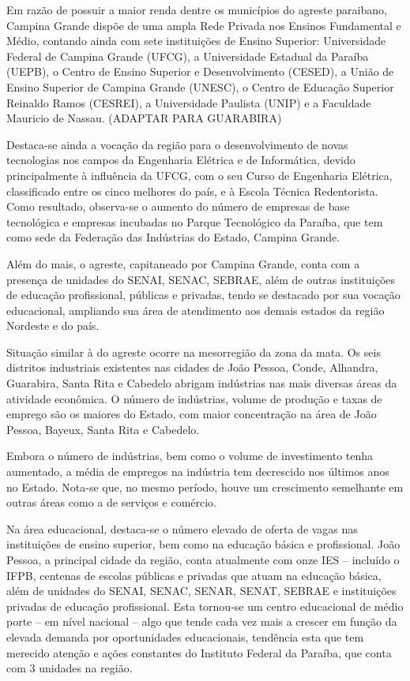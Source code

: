 	Em razão de possuir a maior renda dentre os municípios do agreste paraibano, Campina Grande dispõe de uma ampla Rede Privada nos Ensinos Fundamental e Médio, contando ainda com sete instituições de Ensino Superior: Universidade Federal de Campina Grande (UFCG), a Universidade Estadual da Paraíba (UEPB), o Centro de Ensino Superior e Desenvolvimento (CESED), a União de Ensino Superior de Campina Grande (UNESC), o Centro de Educação Superior Reinaldo Ramos (CESREI), a Universidade Paulista (UNIP) e a Faculdade Mauricio de Nassau. (ADAPTAR PARA GUARABIRA)


Destaca-se ainda a vocação da região para o desenvolvimento de novas tecnologias nos campos da Engenharia Elétrica e de Informática, devido principalmente à influência da UFCG, com o seu Curso de Engenharia Elétrica, classificado entre os cinco melhores do país, e à Escola Técnica Redentorista. Como resultado, observa-se o aumento do número de empresas de base tecnológica e empresas incubadas no Parque Tecnológico da Paraíba, que tem como sede da Federação das Indústrias do Estado, Campina Grande.

	Além do mais, o agreste, capitaneado por Campina Grande, conta com a presença de unidades do SENAI, SENAC, SEBRAE, além de outras instituições de educação profissional, públicas e privadas, tendo se destacado por sua vocação educacional, ampliando sua área de atendimento aos demais estados da região Nordeste e do país.
	
	Situação similar à do agreste ocorre na mesorregião da zona da mata. Os seis distritos industriais existentes nas cidades de João Pessoa, Conde, Alhandra, Guarabira, Santa Rita e Cabedelo abrigam indústrias nas mais diversas áreas da atividade econômica. O número de indústrias, volume de produção e taxas de emprego são os maiores do Estado, com maior concentração na área de João Pessoa, Bayeux, Santa Rita e Cabedelo.
	
	Embora o número de indústrias, bem como o volume de investimento tenha aumentado, a média de empregos na indústria tem decrescido nos últimos anos no Estado. Nota-se que, no mesmo período, houve um crescimento semelhante em outras áreas como a de serviços e comércio.
	
	Na área educacional, destaca-se o número elevado de oferta de vagas nas instituições de ensino superior, bem como na educação básica e profissional. João Pessoa, a principal cidade da região, conta atualmente com onze IES – incluído o IFPB, centenas de escolas públicas e privadas que atuam na educação básica, além de unidades do SENAI, SENAC, SENAR, SENAT, SEBRAE e instituições privadas de educação profissional. Esta tornou-se um centro educacional de médio porte – em nível nacional – algo que tende cada vez mais a crescer em função da elevada demanda por oportunidades educacionais, tendência esta que tem merecido atenção e ações constantes do Instituto Federal da Paraíba, que conta com 3 unidades na região.
	
